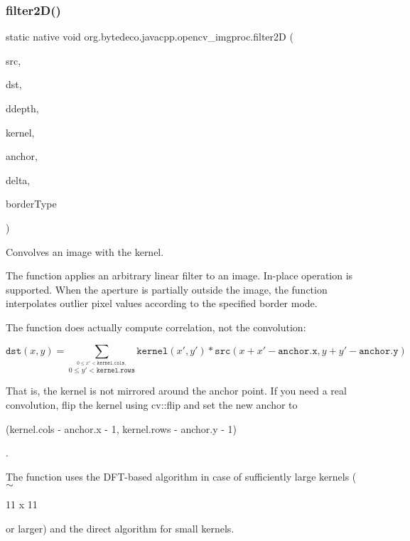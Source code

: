\subsubsection{\texorpdfstring{filter2\+D()}{filter2D()}}
{\footnotesize\ttfamily static native void org.\+bytedeco.\+javacpp.\+opencv\+\_\+imgproc.\+filter2D (\begin{DoxyParamCaption}\item[{@By\+Val Mat}]{src,  }\item[{@By\+Val Mat}]{dst,  }\item[{int}]{ddepth,  }\item[{@By\+Val Mat}]{kernel,  }\item[{@By\+Val(null\+Value=\char`\"{}cv\+::\+Point(-\/1,-\/1)\char`\"{}) Point}]{anchor,  }\item[{double}]{delta,  }\item[{int}]{border\+Type }\end{DoxyParamCaption})\hspace{0.3cm}{\ttfamily [static]}}



Convolves an image with the kernel. 

The function applies an arbitrary linear filter to an image. In-\/place operation is supported. When the aperture is partially outside the image, the function interpolates outlier pixel values according to the specified border mode. 

The function does actually compute correlation, not the convolution\+: 

\[\texttt{dst} (x,y) = \sum _{ \stackrel{0\leq x' < \texttt{kernel.cols},}{0\leq y' < \texttt{kernel.rows}} } \texttt{kernel} (x',y')* \texttt{src} (x+x'- \texttt{anchor.x} ,y+y'- \texttt{anchor.y} )\] 

That is, the kernel is not mirrored around the anchor point. If you need a real convolution, flip the kernel using cv\+::flip and set the new anchor to
\begin{DoxyCode}
 (kernel.cols - anchor.x - 1, kernel.rows -
anchor.y - 1) 
\end{DoxyCode}
 . 

The function uses the D\+F\+T-\/based algorithm in case of sufficiently large kernels ($\sim$
\begin{DoxyCode}
11 x 11 
\end{DoxyCode}
 or larger) and the direct algorithm for small kernels. 


